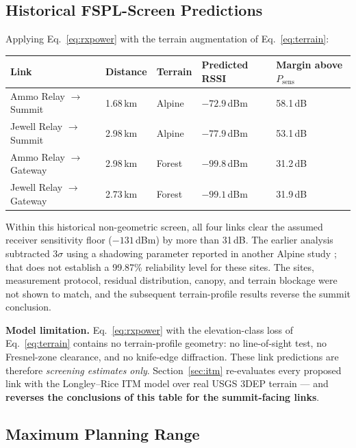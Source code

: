 \documentclass[11pt,letterpaper]{article}
\begin{document}
\subsection{Historical FSPL-Screen Predictions}

Applying Eq.~\eqref{eq:rxpower} with the terrain augmentation of Eq.~\eqref{eq:terrain}:

\begin{center}
\begin{tabular}{@{}lllll@{}}
\toprule
\textbf{Link} & \textbf{Distance} & \textbf{Terrain} & \textbf{Predicted RSSI} & \textbf{Margin above $P_\mathrm{sens}$} \\
\midrule
Ammo Relay $\to$ Summit  & 1.68\,km & Alpine  & $-72.9$\,dBm & 58.1\,dB \\
Jewell Relay $\to$ Summit & 2.98\,km & Alpine  & $-77.9$\,dBm & 53.1\,dB \\
Ammo Relay $\to$ Gateway  & 2.98\,km & Forest  & $-99.8$\,dBm & 31.2\,dB \\
Jewell Relay $\to$ Gateway & 2.73\,km & Forest & $-99.1$\,dBm & 31.9\,dB \\
\bottomrule
\end{tabular}
\end{center}

Within this historical non-geometric screen, all four links clear the assumed receiver
sensitivity floor ($-131$\,dBm) by more than 31\,dB. The earlier analysis subtracted
$3\sigma$ using a shadowing parameter reported in another Alpine study
\cite{bianco2021}; that does not establish a 99.87\% reliability level for these sites.
The sites, measurement protocol, residual distribution, canopy, and terrain blockage
were not shown to match, and the subsequent terrain-profile results reverse the summit
conclusion.

\textbf{Model limitation.} Eq.~\eqref{eq:rxpower} with the elevation-class loss of
Eq.~\eqref{eq:terrain} contains no terrain-profile geometry: no line-of-sight test, no
Fresnel-zone clearance, and no knife-edge diffraction. These link predictions are
therefore \emph{screening estimates only}. Section~\ref{sec:itm} re-evaluates every
proposed link with the Longley--Rice ITM model over real USGS 3DEP terrain --- and
\textbf{reverses the conclusions of this table for the summit-facing links}.

\subsection{Maximum Planning Range}
\end{document}
